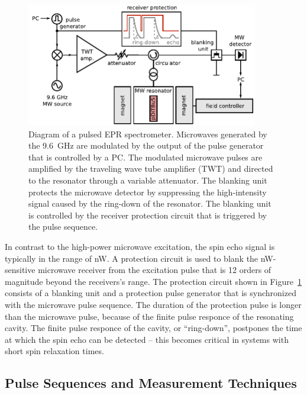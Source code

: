 \begin{figure}[h]
\center
	\includegraphics[width=0.9\textwidth]{./pulse/figures/pEPR_spectrometer_diagram.pdf}
	\caption{Diagram of a pulsed EPR spectrometer. Microwaves generated by the 9.6~GHz are modulated by the output of the pulse generator that is controlled by a PC. The modulated microwave pulses are amplified by the traveling wave tube amplifier (TWT) and directed to the resonator through a variable attenuator. The blanking unit protects the microwave detector by suppressing the high-intensity signal caused by the ring-down of the resonator. The blanking unit is controlled by the receiver protection circuit that is triggered by the pulse sequence.}
	\label{fig:pepr_spectrometer_diagram}
\end{figure}

In contrast to the high-power microwave excitation, the spin echo signal is typically in the range of nW. A protection circuit is used to blank the nW-sensitive microwave receiver from the excitation pulse that is 12 orders of magnitude beyond the receivers's range. The protection circuit shown in Figure~\ref{fig:pepr_spectrometer_diagram} consists of a blanking unit and a protection pulse generator that is synchronized with the microwave pulse sequence. The duration of the protection pulse is longer than the microwave pulse, because of the finite pulse responce of the resonating cavity. The finite pulse responce of the cavity, or ``ring-down'', postpones the time at which the spin echo can be detected -- this becomes critical in systems with short spin relaxation times.

\subsection{Pulse Sequences and Measurement Techniques}
